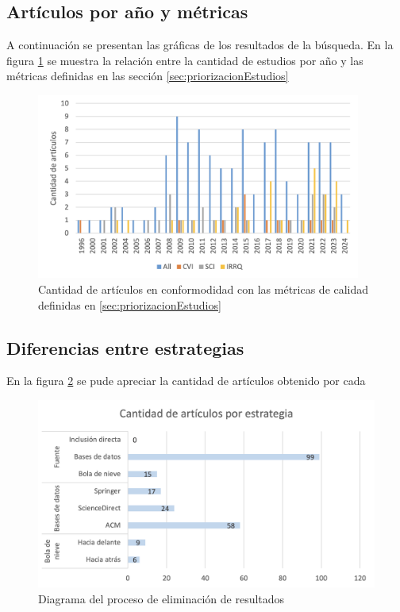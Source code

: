 

\subsection{Artículos por año y métricas}
\noindent
A continuación se presentan las gráficas de los resultados de la búsqueda. En la figura \ref{fig:plot-anios-vs-indices-calidad} se muestra la relación entre la cantidad de estudios por año y las métricas definidas en las sección \ref{sec:priorizacionEstudios}

\begin{figure}[H]
	\begin{center}
		\includegraphics[width=0.95\textwidth]{tablas-images/sms/plot-freq-indices.png}
	\end{center}
	\caption{Cantidad de artículos en conformodidad con las métricas de calidad definidas en \ref{sec:priorizacionEstudios}}
	\label{fig:plot-anios-vs-indices-calidad}
\end{figure}



\subsection{Diferencias entre estrategias}

En la figura \ref{fig:plot-estrategia_vs_articulos} se pude apreciar la cantidad de artículos obtenido por cada

\begin{figure}[H]
	\centering
	\includegraphics[scale=0.3] {tablas-images/sms/plot-estrategia_vs_articulos.png}
	\caption{Diagrama del proceso de eliminación de resultados}\label{fig:plot-estrategia_vs_articulos}
\end{figure}


